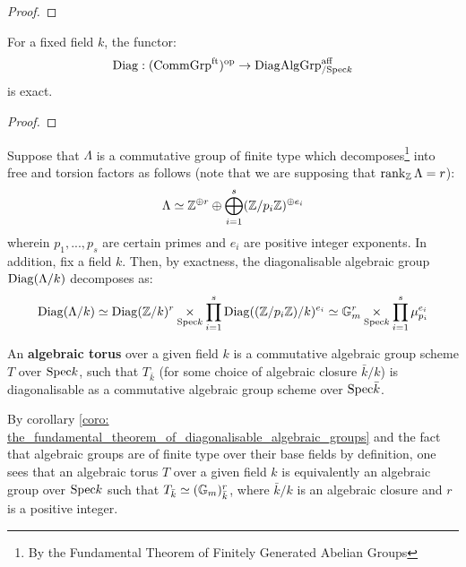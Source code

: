                 \begin{proof}
                    
                \end{proof}
            \begin{corollary} \label{coro: diagonalisation_is_exact}
                For a fixed field $k$, the functor:
                    $$\mathrm{Diag}: (\mathrm{Comm}\mathrm{Grp}^{\mathrm{ft}})^{\mathrm{op}} \to \mathrm{Diag}\mathrm{Alg}\mathrm{Grp}^{\mathrm{aff}}_{/\mathrm{Spec} k}$$
                is exact. 
            \end{corollary}
                \begin{proof}
                    
                \end{proof}
            \begin{corollary} \label{coro: the_fundamental_theorem_of_diagonalisable_algebraic_groups}
                Suppose that $\Lambda$ is a commutative group of finite type which decomposes\footnote{By the Fundamental Theorem of Finitely Generated Abelian Groups} into free and torsion factors as follows (note that we are supposing that $\operatorname{rank}_{\mathbb{Z}} \Lambda = r$):
                    $$\Lambda \simeq \mathbb{Z}^{\oplus r} \oplus \bigoplus_{i = 1}^s (\mathbb{Z}/p_i\mathbb{Z})^{\oplus e_i}$$
                wherein $p_1, ..., p_s$ are certain primes and $e_i$ are positive integer exponents. In addition, fix a field $k$. Then, by exactness, the diagonalisable algebraic group $\mathrm{Diag}(\Lambda/k)$ decomposes as:
                    $$\Diag(\Lambda/k) \cong \Diag(\Z/k)^r \x_{\Spec k} \prod_{i = 1}^s \Diag((\Z/p_i\Z)/k)^{e_i} \cong \G_m^r \x_{\Spec k} \prod_{i = 1}^s \mu_{p_i}^{e_i}$$
            \end{corollary}
            
            \begin{definition} \label{def: algebraic_tori}
                An \textbf{algebraic torus} over a given field $k$ is a commutative algebraic group scheme $T$ over $\mathrm{Spec} k$, such that $T_{\bar{k}}$ (for some choice of algebraic closure $\bar{k}/k$) is diagonalisable as a commutative algebraic group scheme over $\mathrm{Spec} \bar{k}$.
            \end{definition}
            \begin{remark}
                By corollary \ref{coro: the_fundamental_theorem_of_diagonalisable_algebraic_groups} and the fact that algebraic groups are of finite type over their base fields by definition, one sees that an algebraic torus $T$ over a given field $k$ is equivalently an algebraic group over $\mathrm{Spec} k$ such that $T_{\bar{k}} \simeq (\mathbb{G}_m)_{\bar{k}}^r$, where $\bar{k}/k$ is an algebraic closure and $r$ is a positive integer.  
            \end{remark}
            
